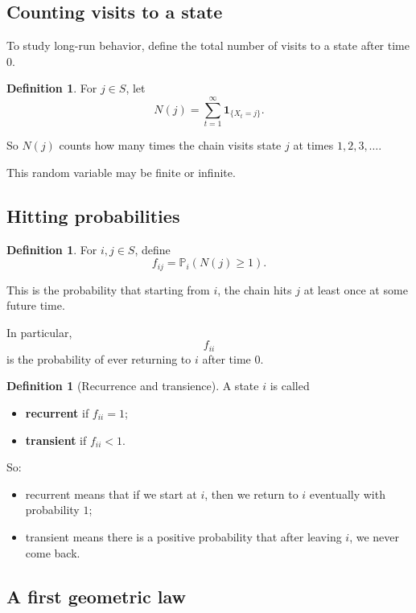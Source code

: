 \documentclass[11pt]{article}
\theoremstyle{definition}
\newtheorem{definition}[theorem]{Definition}
\begin{document}
\subsection{Counting visits to a state}

To study long-run behavior, define the total number of visits to a state after time \(0\).

\begin{definition}
For \(j\in S\), let
\[
N(j)=\sum_{t=1}^{\infty}\mathbf 1_{\{X_t=j\}}.
\]
\end{definition}

So \(N(j)\) counts how many times the chain visits state \(j\) at times \(1,2,3,\dots\).

This random variable may be finite or infinite.

\subsection{Hitting probabilities}

\begin{definition}
For \(i,j\in S\), define
\[
f_{ij}=\mathbb P_i(N(j)\ge 1).
\]
\end{definition}

This is the probability that starting from \(i\), the chain hits \(j\) at least once at some future time.

In particular,
\[
f_{ii}
\]
is the probability of ever returning to \(i\) after time \(0\).

\begin{definition}[Recurrence and transience]
A state \(i\) is called
\begin{itemize}[leftmargin=2em]
    \item \textbf{recurrent} if \(f_{ii}=1\);
    \item \textbf{transient} if \(f_{ii}<1\).
\end{itemize}
\end{definition}

So:
\begin{itemize}[leftmargin=2em]
    \item recurrent means that if we start at \(i\), then we return to \(i\) eventually with probability \(1\);
    \item transient means there is a positive probability that after leaving \(i\), we never come back.
\end{itemize}

\subsection{A first geometric law}
\end{document}
